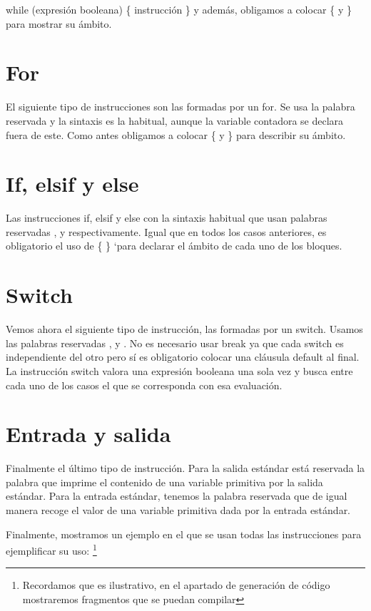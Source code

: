 while (expresión booleana) \{ instrucción \}
y además, obligamos a colocar \{ y \} para mostrar su ámbito. 

\section{For}
El siguiente tipo de instrucciones son las formadas por un for. Se usa la palabra reservada  y la sintaxis es la habitual, aunque la variable contadora se declara fuera de este.
Como antes obligamos a colocar \{ y \} para describir su ámbito. 

	
\section{If, elsif y else}
Las instrucciones if, elsif y else con la sintaxis habitual que usan palabras reservadas ,  y 
 respectivamente. Igual que en todos los casos anteriores, es obligatorio el uso de \{ \} `para declarar el ámbito de cada uno de los bloques.

\section{Switch}
Vemos ahora el siguiente tipo de instrucción, las formadas por un switch. Usamos las palabras reservadas ,
 y . No es necesario usar break ya que cada switch es independiente del otro pero sí es obligatorio colocar una cláusula default al final. La instrucción switch valora una expresión booleana una sola vez y busca entre cada uno de los casos el que se corresponda con esa evaluación.

\section{Entrada y salida}
Finalmente el último tipo de instrucción. Para la salida estándar está reservada la palabra  que imprime el contenido de una variable primitiva por la salida estándar. Para la entrada estándar, tenemos la palabra reservada  que de igual manera recoge el valor de una variable primitiva dada por la entrada estándar.

\bigskip
Finalmente, mostramos un ejemplo en el que se usan todas las instrucciones para ejemplificar su uso: \footnote{Recordamos que es ilustrativo, en el apartado de generación de código
mostraremos fragmentos que se puedan compilar}

